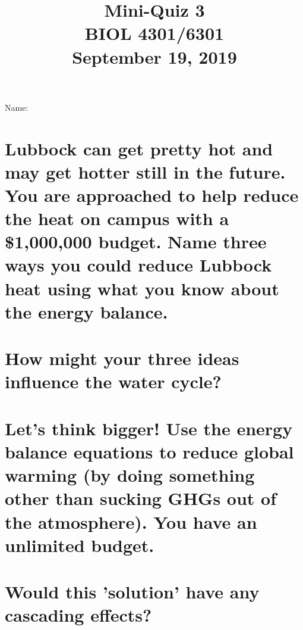 \documentclass[12pt, notitlepage]{article}   	%
\title{
	\textbf{
		Mini-Quiz 3
	} \\
	\large BIOL 4301/6301 \\
	\large September 19, 2019 \\
}
\date{\vspace{-5ex}}
\def\wl{\par \vspace{\baselineskip}}
\begin{document}
{\selectfont %

\large{Name:}

{\let\newpage\relax\maketitle}

\section{\small{Lubbock can get pretty hot and may get hotter still in the future.
You are approached to help reduce the heat on campus with a \$1,000,000 budget.
Name three ways you could reduce Lubbock heat using what you know about the
energy balance.}}

\wl
\wl
\wl
\wl
\wl
\wl
\wl
\wl
\wl

\section{\small{How might your three ideas influence the water cycle?}}

\newpage

\section{\small{Let's think bigger! Use the energy balance equations to reduce global warming
(by doing something other than sucking GHGs out of the atmosphere). You have an unlimited budget.}}

\wl
\wl
\wl
\wl
\wl
\wl
\wl
\wl
\wl
\wl
\wl
\wl
\wl
\wl

\section{\small{Would this 'solution' have any cascading effects?}}

} %
\end{document}
